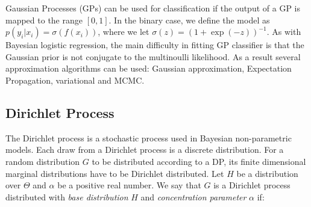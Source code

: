 Gaussian Processes (GPs) can be used for classification if the output of a GP is mapped to the range $[0, 1]$. In the binary case, we define the model as $p(y_i|x_i) = \sigma(f(x_i))$, where we let $\sigma(z)=(1+\exp(-z))^{-1}$. As with Bayesian logistic regression, the main difficulty in fitting GP classifier is that the Gaussian prior is not conjugate to the multinoulli likelihood. As a result several approximation algorithms can be used: Gaussian approximation, Expectation Propagation, variational and MCMC. 


\subsection{Dirichlet Process}


The Dirichlet process is a stochastic process used in Bayesian non-parametric models. Each draw from a Dirichlet process is a discrete distribution. For a random distribution $G$ to be distributed according to a DP, its finite dimensional marginal distributions have to be Dirichlet distributed. Let $H$ be a distribution over $\Theta$ and $\alpha$ be a positive real number. We say that $G$ is a Dirichlet process distributed with \textit{base distribution} $H$ and \textit{concentration parameter} $\alpha$ if:

